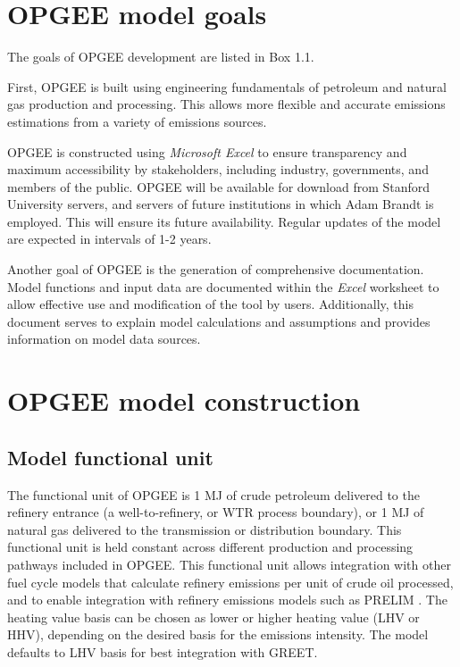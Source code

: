 \documentclass[11pt]{report}
\begin{document}
\section{OPGEE model goals}

The goals of OPGEE development are listed in Box 1.1. 

First, OPGEE is built using engineering fundamentals of petroleum and natural gas production and processing. This allows more flexible and accurate emissions estimations from a variety of emissions sources.

OPGEE is constructed using \emph{Microsoft Excel} to ensure transparency and maximum accessibility by stakeholders, including industry, governments, and members of the public. OPGEE will be available for download from Stanford University servers, and servers of future institutions in which Adam Brandt is employed. This will ensure its future availability. Regular updates of the model are expected in intervals of 1-2 years.

Another goal of OPGEE is the generation of comprehensive documentation. Model functions and input data are documented within the \emph{Excel} worksheet to allow effective use and modification of the tool by users. Additionally, this document serves to explain model calculations and assumptions and provides information on model data sources.




\clearpage

\section{OPGEE model construction}

\subsection{Model functional unit}

The functional unit of OPGEE is 1 MJ of crude petroleum delivered to the refinery entrance (a well-to-refinery, or WTR process boundary), or 1 MJ of natural gas delivered to the transmission or distribution boundary. This functional unit is held constant across different production and processing pathways included in OPGEE. This functional unit allows integration with other fuel cycle models that calculate refinery emissions per unit of crude oil processed, and to enable integration with refinery emissions models such as PRELIM \cite{Abella2012}. The heating value basis can be chosen as lower or higher heating value (LHV or HHV), depending on the desired basis for the emissions intensity. The model defaults to LHV basis for best integration with GREET.
\end{document}
